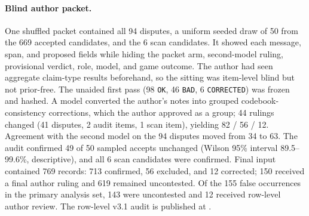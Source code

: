 \documentclass[11pt]{article}
\newcommand{\code}[1]{\texttt{#1}}
\begin{document}
\paragraph{Blind author packet.} One shuffled packet contained all 94 disputes, a uniform seeded draw of 50 from the 669 accepted candidates, and the 6 scan candidates. It showed each message, span, and proposed fields while hiding the packet arm, second-model ruling, provisional verdict, role, model, and game outcome. The author had seen aggregate claim-type results beforehand, so the sitting was item-level blind but not prior-free. The unaided first pass (98 \code{OK}, 46 \code{BAD}, 6 \code{CORRECTED}) was frozen and hashed. A model converted the author's notes into grouped codebook-consistency corrections, which the author approved as a group; 44 rulings changed (41 disputes, 2 audit items, 1 scan item), yielding 82 / 56 / 12. Agreement with the second model on the 94 disputes moved from 34 to 63. The audit confirmed 49 of 50 sampled accepts unchanged (Wilson 95\% interval 89.5--99.6\%, descriptive), and all 6 scan candidates were confirmed. Final input contained 769 records: 713 confirmed, 56 excluded, and 12 corrected; 150 received a final author ruling and 619 remained uncontested. Of the 155 false occurrences in the primary analysis set, 143 were uncontested and 12 received row-level author review. The row-level v3.1 audit is published at .
\end{document}
